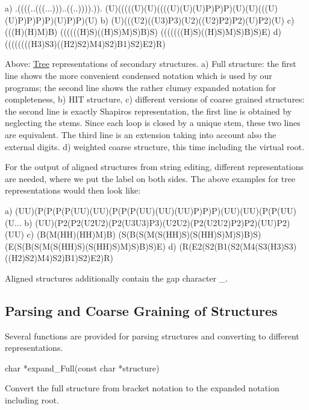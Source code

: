 \begin{DoxyVerb}a) .((((..(((...)))..((..)))).)).
   (U)(((((U)(U)((((U)(U)(U)P)P)P)(U)(U)(((U)(U)P)P)P)P)(U)P)P)(U)
b) (U)(((U2)((U3)P3)(U2)((U2)P2)P2)(U)P2)(U)
c) (((H)(H)M)B)
   ((((((H)S)((H)S)M)S)B)S)
   (((((((H)S)((H)S)M)S)B)S)E)
d) ((((((((H3)S3)((H2)S2)M4)S2)B1)S2)E2)R)
\end{DoxyVerb}


Above\+: \hyperlink{structTree}{Tree} representations of secondary structures. a) Full structure\+: the first line shows the more convenient condensed notation which is used by our programs; the second line shows the rather clumsy expanded notation for completeness, b) H\+I\+T structure, c) different versions of coarse grained structures\+: the second line is exactly Shapiro\textquotesingle{}s representation, the first line is obtained by neglecting the stems. Since each loop is closed by a unique stem, these two lines are equivalent. The third line is an extension taking into account also the external digits. d) weighted coarse structure, this time including the virtual root.

For the output of aligned structures from string editing, different representations are needed, where we put the label on both sides. The above examples for tree representations would then look like\+:

\begin{DoxyVerb}a) (UU)(P(P(P(P(UU)(UU)(P(P(P(UU)(UU)(UU)P)P)P)(UU)(UU)(P(P(UU)(U...
b) (UU)(P2(P2(U2U2)(P2(U3U3)P3)(U2U2)(P2(U2U2)P2)P2)(UU)P2)(UU)
c) (B(M(HH)(HH)M)B)
   (S(B(S(M(S(HH)S)(S(HH)S)M)S)B)S)
   (E(S(B(S(M(S(HH)S)(S(HH)S)M)S)B)S)E)
d) (R(E2(S2(B1(S2(M4(S3(H3)S3)((H2)S2)M4)S2)B1)S2)E2)R)
\end{DoxyVerb}


Aligned structures additionally contain the gap character \textquotesingle{}\+\_\+\textquotesingle{}.

\subsection*{Parsing and Coarse Graining of Structures}

Several functions are provided for parsing structures and converting to different representations.

\begin{DoxyVerb}char  *expand_Full(const char *structure)
\end{DoxyVerb}
 Convert the full structure from bracket notation to the expanded notation including root.

